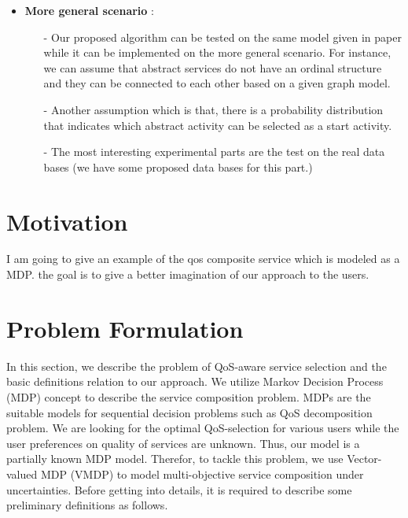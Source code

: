 \documentclass[10pt,journal,compsoc]{IEEEtran}
\begin{document}
\begin{itemize}
\begin{itemize}
\end{itemize}

\item \textbf{More general scenario} : \\
\begin{itemize}

\item[-] Our proposed algorithm can be tested on the same model given in paper \cite{DBLP:journals/tase/KhanoucheACKY16} while it can be implemented on the more general scenario. For instance, we can assume that abstract services do not have an ordinal structure and they can be connected to each other based on a given graph model. 

\item[-] Another assumption which is that, there is a probability distribution that indicates which abstract activity can be selected as a start activity. 

\item[-] The most interesting experimental parts are the test on the real data bases ({\color{red}we have some proposed data bases for this part.}) 

\end{itemize}
\end{itemize}

\section{Motivation}
I am going to give an example of the qos composite service which is modeled as a MDP. the goal is to give a better imagination of our approach to the users. 

\section{Problem Formulation}

In this section, we describe the problem of QoS-aware service selection and the basic definitions relation to our approach.
 We utilize Markov Decision Process (MDP) concept to describe the service composition problem. MDPs are the suitable models for sequential decision problems such as QoS decomposition problem. We are looking for the optimal QoS-selection for various users while the user preferences on quality of services are unknown. Thus, our model is a partially known MDP model. Therefor, to tackle this problem, we use Vector-valued MDP (VMDP) to model multi-objective service composition under uncertainties. Before getting into details, it is required to describe some preliminary definitions as follows. 
\end{document}
